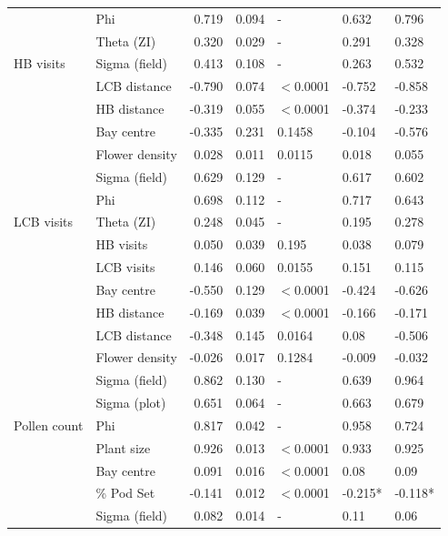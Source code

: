 \documentclass[12pt]{article} %
\begin{document}
\begin{longtable}{l|l|r|r|l|l|l}
\cline{2-7}
 & Phi & 0.719 & 0.094 & - & 0.632 & 0.796\\
\cline{2-7}
 & Theta (ZI) & 0.320 & 0.029 & - & 0.291 & 0.328\\
\cline{2-7}
\multirow{-7}{*}{\raggedright\arraybackslash HB visits} & Sigma (field) & 0.413 & 0.108 & - & 0.263 & 0.532\\
\cline{1-7}
 & LCB distance & -0.790 & 0.074 & $<$0.0001 & -0.752 & -0.858\\
\cline{2-7}
 & HB distance & -0.319 & 0.055 & $<$0.0001 & -0.374 & -0.233\\
\cline{2-7}
 & Bay centre & -0.335 & 0.231 & 0.1458 & -0.104 & -0.576\\
\cline{2-7}
 & Flower density & 0.028 & 0.011 & 0.0115 & 0.018 & 0.055\\
\cline{2-7}
 & Sigma (field) & 0.629 & 0.129 & - & 0.617 & 0.602\\
\cline{2-7}
 & Phi & 0.698 & 0.112 & - & 0.717 & 0.643\\
\cline{2-7}
\multirow{-7}{*}{\raggedright\arraybackslash LCB visits} & Theta (ZI) & 0.248 & 0.045 & - & 0.195 & 0.278\\
\cline{1-7}
 & HB visits & 0.050 & 0.039 & 0.195 & 0.038 & 0.079\\
\cline{2-7}
 & LCB visits & 0.146 & 0.060 & 0.0155 & 0.151 & 0.115\\
\cline{2-7}
 & Bay centre & -0.550 & 0.129 & $<$0.0001 & -0.424 & -0.626\\
\cline{2-7}
 & HB distance & -0.169 & 0.039 & $<$0.0001 & -0.166 & -0.171\\
\cline{2-7}
 & LCB distance & -0.348 & 0.145 & 0.0164 & 0.08 & -0.506\\
\cline{2-7}
 & Flower density & -0.026 & 0.017 & 0.1284 & -0.009 & -0.032\\
\cline{2-7}
 & Sigma (field) & 0.862 & 0.130 & - & 0.639 & 0.964\\
\cline{2-7}
 & Sigma (plot) & 0.651 & 0.064 & - & 0.663 & 0.679\\
\cline{2-7}
\multirow{-9}{*}{\raggedright\arraybackslash Pollen count} & Phi & 0.817 & 0.042 & - & 0.958 & 0.724\\
\cline{1-7}
 & Plant size & 0.926 & 0.013 & $<$0.0001 & 0.933 & 0.925\\
\cline{2-7}
 & Bay centre & 0.091 & 0.016 & $<$0.0001 & 0.08 & 0.09\\
\cline{2-7}
 & \% Pod Set & -0.141 & 0.012 & $<$0.0001 & -0.215* & -0.118*\\
\cline{2-7}
 & Sigma (field) & 0.082 & 0.014 & - & 0.11 & 0.06\\

\end{longtable}
\end{document}

